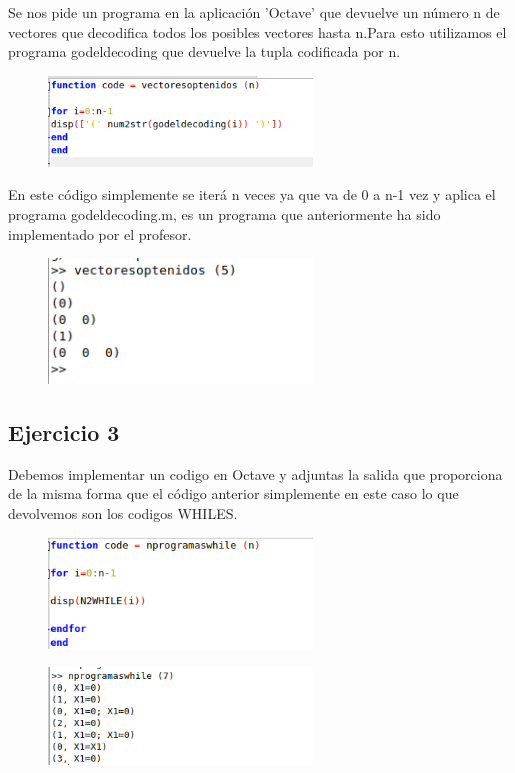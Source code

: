 \documentclass[fleqn, 10pt]{article}
\theoremstyle{plain}
\theoremstyle{definition}
\begin{document}
Se nos pide un programa en la aplicación 'Octave' que devuelve un número n de vectores que decodifica todos los posibles vectores hasta n.Para esto utilizamos el programa godeldecoding que devuelve la tupla codificada por n.

\begin{figure}[h]

\includegraphics[width=7cm]{Codigo}

\end{figure}

\qquad

En este código simplemente se iterá n veces ya que va de 0 a n-1 vez y aplica el programa godeldecoding.m, es un programa que anteriormente ha sido implementado por el profesor.


\begin{figure}[h]

\includegraphics[width=7cm]{Salida}

\end{figure}

\newpage

\subsection{Ejercicio 3}

Debemos implementar un codigo en Octave y adjuntas la salida que proporciona de la misma forma que el código anterior simplemente en este caso lo que devolvemos son los codigos WHILES.


\begin{figure}[h]

\includegraphics[width=7cm]{Codigo1}

\end{figure}



\begin{figure}[h]

\includegraphics[width=7cm]{Salida1}

\end{figure}
\end{document}
